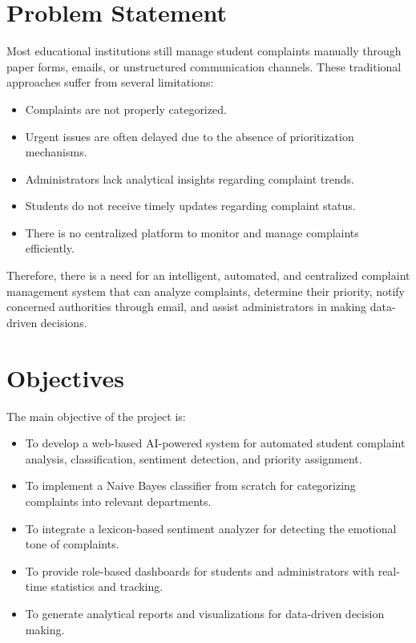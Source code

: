 \documentclass[12pt,a4paper]{report}
\begin{document}
\section{Problem Statement}
Most educational institutions still manage student complaints manually through paper forms, emails, or unstructured communication channels. These traditional approaches suffer from several limitations:
\begin{itemize}[nolistsep]
    \item Complaints are not properly categorized.
    \item Urgent issues are often delayed due to the absence of prioritization mechanisms.
    \item Administrators lack analytical insights regarding complaint trends.
    \item Students do not receive timely updates regarding complaint status.
    \item There is no centralized platform to monitor and manage complaints efficiently.
\end{itemize}

Therefore, there is a need for an intelligent, automated, and centralized complaint management system that can analyze complaints, determine their priority, notify concerned authorities through email, and assist administrators in making data-driven decisions.

\section{Objectives}
The main objective of the project is:
\begin{itemize}[nolistsep]
    \item To develop a web-based AI-powered system for automated student complaint analysis, classification, sentiment detection, and priority assignment.
    \item To implement a Naive Bayes classifier from scratch for categorizing complaints into relevant departments.
    \item To integrate a lexicon-based sentiment analyzer for detecting the emotional tone of complaints.
    \item To provide role-based dashboards for students and administrators with real-time statistics and tracking.
    \item To generate analytical reports and visualizations for data-driven decision making.
\end{itemize}
\end{document}
